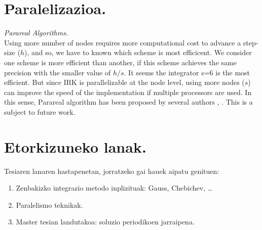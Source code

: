 \section{Paralelizazioa.}

\vspace{5mm}
\textit{Parareal Algorithms.}\\

Using more number of nodes requires more computational cost to advance a step-size ($h$), and so, we have to known which scheme is most efficicent. We consider one scheme is more efficient than another, if this scheme achieves the same precision with the smaller value of $h/s$. It seems the integrator s=6 is the most efficient. 
But since IRK is parallelizable at the node level, using more nodes ($s$) can improve the speed of the implementation if multiple processors are used. In this sense, Parareal algorithm has been proposed by several authors \cite{Gander2014}, \cite{Jimenez-Perez2011}. This is a subject to future work.

\section{Etorkizuneko lanak.}

Tesiaren lanaren hastapenetan, jorratzeko gai hauek aipatu genituen:
\begin{enumerate}
\item Zenbakizko integrazio metodo inplizituak: Gauss, Chebichev, \dots 
\item Paralelismo teknikak.
\item Master tesian landutakoa: soluzio periodikoen jarraipena.
\end{enumerate} 

